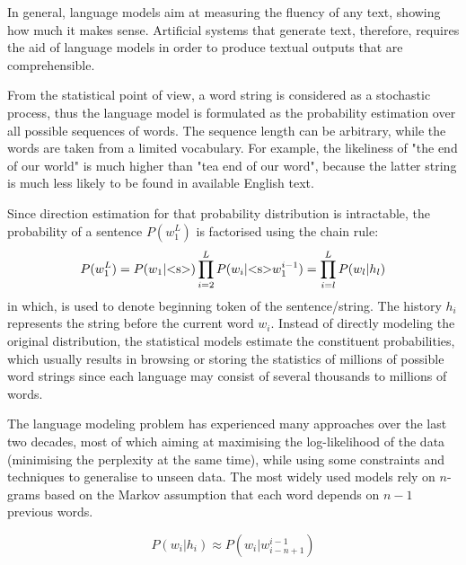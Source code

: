 In general, language models aim at measuring the fluency of any text, showing how much it makes sense. Artificial systems that generate text, therefore, requires
the aid of language models in order to produce textual outputs that are comprehensible. 

From the statistical point of view, a word string is considered as a stochastic process, thus the language model is formulated as the probability estimation over all 
possible sequences of words. The sequence length can be arbitrary, while the words are taken from a limited vocabulary. For example, the likeliness of "the end of our world" is much higher than "tea end of our word", because the latter string is much less likely to be found in available English text. 

Since direction estimation for that probability distribution is intractable, the probability of a sentence $P(w_1^L)$ is factorised using the chain rule:
\begin{equation}
\label{eq:lm1}
P(w_1^L) = P(w_1 | \text{\textless s\textgreater}) \prod_{i=2}^L P(w_i | \text{\textless s\textgreater} w_1^{i-1})\\
		 = \prod_{i=l}^L P(w_l | h_l)
\end{equation}
in which,  is used to denote beginning token of the sentence/string. The history $h_i$ represents the string before the current word $w_i$. Instead of directly modeling the original distribution, the statistical models estimate the constituent probabilities, which usually results in browsing or storing the statistics of millions of
possible word strings since each language may consist of several thousands to millions of words. 

The language modeling problem has experienced many approaches over the last two decades, most of which aiming at maximising the log-likelihood of the data (minimising the perplexity at the same time), while using some constraints and techniques to generalise to unseen data. The most widely used models rely on $n$-grams based on the Markov assumption that each word depends on $n-1$ previous words. 

\begin{equation}
\label{eq:markov}
P(w_i|h_i) \approx P(w_i|w_{i-n+1}^{i-1})
\end{equation}

